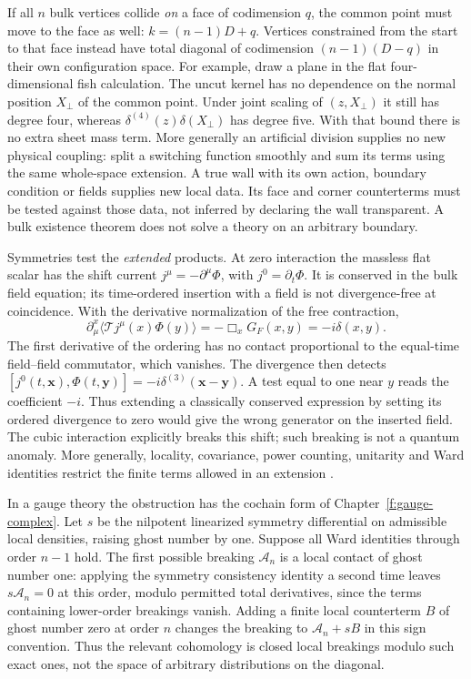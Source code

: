 If all $n$ bulk vertices collide \emph{on} a face of codimension $q$,
the common point must move to the face as well: $k=(n-1)D+q$. Vertices
constrained from the start to that face instead have total diagonal of
codimension $(n-1)(D-q)$ in their own configuration space. For example,
draw a plane in the flat four-dimensional fish calculation. The uncut
kernel has no dependence on the normal position $X_\perp$ of the common
point. Under joint scaling of $(z,X_\perp)$ it still has degree four,
whereas $\delta^{(4)}(z)\delta(X_\perp)$ has degree five. With that bound
there is no extra sheet mass term. More generally an artificial division
supplies no new physical coupling: split a switching function smoothly and
sum its terms using the same whole-space extension. A true wall with its
own action, boundary condition or fields supplies new local data. Its
face and corner counterterms must be tested against those data, not
inferred by declaring the wall transparent. A bulk existence theorem does
not solve a theory on an arbitrary boundary.

Symmetries test the \emph{extended} products. At zero interaction the
massless flat scalar has the shift current $j^\mu=-\partial^\mu\Phi$,
with $j^0=\partial_t\Phi$. It is conserved in the bulk field equation;
its time-ordered insertion with a field is not divergence-free at
coincidence. With the derivative normalization of the free contraction,
\begin{equation}
 \partial_\mu^x\langle\mathcal T j^\mu(x)\Phi(y)\rangle
   =-\Box_x G_F(x,y)=-i\delta(x,y) .
 \label{f:ext-ward}
\end{equation}
The first derivative of the ordering has no contact proportional to the
equal-time field--field commutator, which vanishes. The divergence then
detects $[j^0(t,\mathbf x),\Phi(t,\mathbf y)]=-i\delta^{(3)}(\mathbf
x-\mathbf y)$. A test equal to one near $y$ reads the coefficient $-i$.
Thus extending a classically conserved expression by setting its ordered
divergence to zero would give the wrong generator on the inserted field.
The cubic interaction explicitly breaks this shift; such breaking is not
a quantum anomaly. More generally, locality, covariance, power counting,
unitarity and Ward identities restrict the finite terms allowed in an
extension \cite{HWick,HWT,FR}.

In a gauge theory the obstruction has the cochain form of
Chapter~\ref{f:gauge-complex}. Let $s$ be the nilpotent linearized
symmetry differential on admissible local densities, raising ghost number
by one. Suppose all Ward identities through order $n-1$ hold. The first
possible breaking $\mathcal A_n$ is a local contact of ghost number one:
applying the symmetry consistency identity a second time leaves
$s\mathcal A_n=0$ at this order, modulo permitted total derivatives,
since the terms containing lower-order breakings vanish. Adding a finite
local counterterm $B$ of ghost number zero at order $n$ changes the
breaking to $\mathcal A_n+sB$ in this sign convention. Thus the relevant
cohomology is closed local breakings modulo such exact ones, not the
space of arbitrary distributions on the diagonal.

